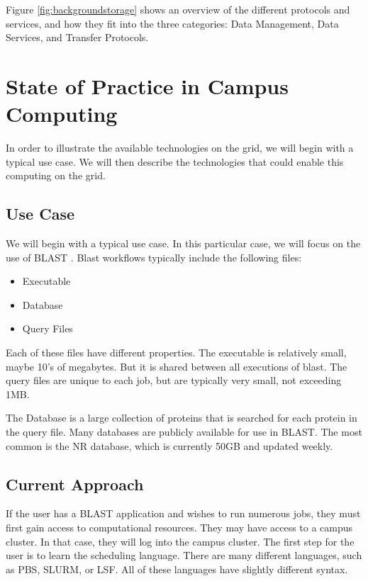 Figure \ref{fig:backgroundstorage} shows an overview of the different protocols and services, and how they fit into the three categories: Data Management, Data Services, and Transfer Protocols.

\section{State of Practice in Campus Computing}

In order to illustrate the available technologies on the grid, we will begin with a typical use case.  We will then describe the technologies that could enable this computing on the grid.

\subsection{Use Case}
We will begin with a typical use case.  In this particular case, we will focus on the use of BLAST \cite{altschul1990basic}.  Blast workflows typically include the following files:

\begin{itemize}
	\item Executable
	\item Database
	\item Query Files
\end{itemize}

Each of these files have different properties.  The executable is relatively small, maybe 10’s of megabytes.  But it is shared between all executions of blast.  The query files are unique to each job, but are typically very small, not exceeding 1MB.  

The Database is a large collection of proteins that is searched for each protein in the query file.  Many databases are publicly available for use in BLAST.  The most common is the NR database, which is currently 50GB and updated weekly.

\subsection{Current Approach}

If the user has a BLAST application and wishes to run numerous jobs, they must first gain access to computational resources.  They may have access to a campus cluster.  In that case, they will log into the campus cluster.  The first step for the user is to learn the scheduling language.  There are many different languages, such as PBS, SLURM, or LSF.  All of these languages have slightly different syntax.

